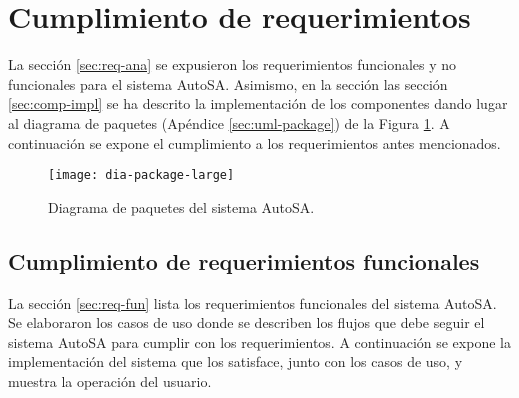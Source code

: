 \section{Cumplimiento de requerimientos}
La sección \ref{sec:req-ana} se expusieron los requerimientos funcionales y no funcionales para el sistema AutoSA. Asimismo, en la sección las sección \ref{sec:comp-impl} se ha descrito la implementación de los componentes dando lugar al diagrama de paquetes (Apéndice \ref{sec:uml-package}) de la Figura \ref{fig:dia-package-large}. A continuación se expone el cumplimiento a los requerimientos antes mencionados.

\begin{figure}[h]
	\centering
	\texttt{[image: dia-package-large]}
	\caption{Diagrama de paquetes del sistema AutoSA.}
	\label{fig:dia-package-large}
\end{figure}


\subsection{Cumplimiento de requerimientos funcionales}
La sección \ref{sec:req-fun} lista los requerimientos funcionales del sistema AutoSA. Se elaboraron los casos de uso donde se describen los flujos que debe seguir el sistema AutoSA para cumplir con los requerimientos. A continuación se expone la implementación del sistema que los satisface, junto con los casos de uso, y muestra la operación del usuario.

